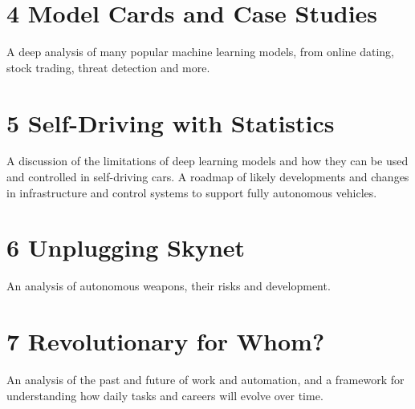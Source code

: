 \section*{4 Model Cards and Case Studies}

A deep analysis of many popular machine learning models, from online dating, stock trading, threat detection and more.

\section*{5 Self-Driving with Statistics}

A discussion of the limitations of deep learning models and how they can be used and controlled in self-driving cars. A roadmap of likely developments and changes in infrastructure and control systems to support fully autonomous vehicles.

\section*{6 Unplugging Skynet}

An analysis of autonomous weapons, their risks and development. 

\section*{7 Revolutionary for Whom?}

An analysis of the past and future of work and automation, and a framework for understanding how daily tasks and careers will evolve over time.
